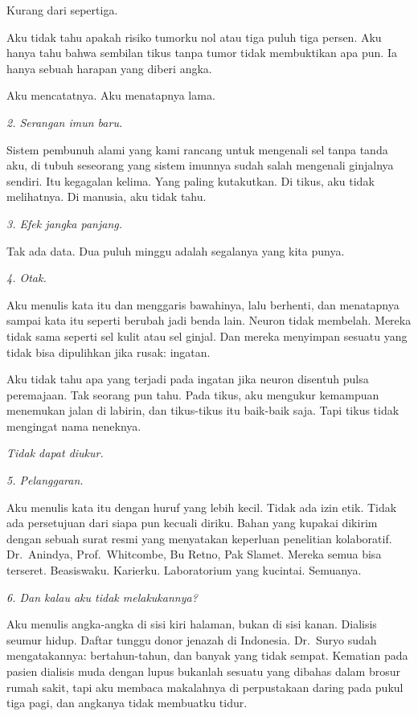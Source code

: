 \documentclass[11pt,twoside,openany]{book}
\begin{document}
Kurang dari sepertiga.

Aku tidak tahu apakah risiko tumorku nol atau tiga puluh tiga persen. Aku hanya tahu bahwa sembilan tikus tanpa tumor tidak membuktikan apa pun. Ia hanya sebuah harapan yang diberi angka.

Aku mencatatnya. Aku menatapnya lama.

\emph{2. Serangan imun baru.}

Sistem pembunuh alami yang kami rancang untuk mengenali sel tanpa tanda aku, di tubuh seseorang yang sistem imunnya sudah salah mengenali ginjalnya sendiri. Itu kegagalan kelima. Yang paling kutakutkan. Di tikus, aku tidak melihatnya. Di manusia, aku tidak tahu.

\emph{3. Efek jangka panjang.}

Tak ada data. Dua puluh minggu adalah segalanya yang kita punya.

\emph{4. Otak.}

Aku menulis kata itu dan menggaris bawahinya, lalu berhenti, dan menatapnya sampai kata itu seperti berubah jadi benda lain. Neuron tidak membelah. Mereka tidak sama seperti sel kulit atau sel ginjal. Dan mereka menyimpan sesuatu yang tidak bisa dipulihkan jika rusak: ingatan.

Aku tidak tahu apa yang terjadi pada ingatan jika neuron disentuh pulsa peremajaan. Tak seorang pun tahu. Pada tikus, aku mengukur kemampuan menemukan jalan di labirin, dan tikus-tikus itu baik-baik saja. Tapi tikus tidak mengingat nama neneknya.

\emph{Tidak dapat diukur.}

\emph{5. Pelanggaran.}

Aku menulis kata itu dengan huruf yang lebih kecil. Tidak ada izin etik. Tidak ada persetujuan dari siapa pun kecuali diriku. Bahan yang kupakai dikirim dengan sebuah surat resmi yang menyatakan keperluan penelitian kolaboratif. Dr.~Anindya, Prof.~Whitcombe, Bu Retno, Pak Slamet. Mereka semua bisa terseret. Beasiswaku. Karierku. Laboratorium yang kucintai. Semuanya.

\emph{6. Dan kalau aku tidak melakukannya?}

Aku menulis angka-angka di sisi kiri halaman, bukan di sisi kanan. Dialisis seumur hidup. Daftar tunggu donor jenazah di Indonesia. Dr.~Suryo sudah mengatakannya: bertahun-tahun, dan banyak yang tidak sempat. Kematian pada pasien dialisis muda dengan lupus bukanlah sesuatu yang dibahas dalam brosur rumah sakit, tapi aku membaca makalahnya di perpustakaan daring pada pukul tiga pagi, dan angkanya tidak membuatku tidur.
\end{document}
